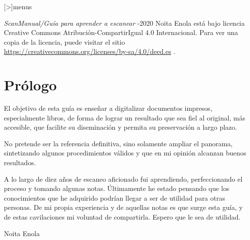 \documentclass[%
	a5paper,
	10pt,
	twoside,
	openright,
	final,
]{memoir}
\begin{document}
%
	\renewmenumacro{\menu}[>]{menus}

	\newpage\null\thispagestyle{empty}\newpage
	\newpage\null\thispagestyle{empty}\newpage

\frontmatter
	\thispagestyle{empty}%
	\halftitleTH%
	\cleardoublepage%
	\thispagestyle{empty}%
	\titleTH%
	\clearpage%

	\thispagestyle{empty}%
	{\emph{ScanManual/Guía para aprender a escanear} -2020 Noita Enola está bajo licencia Creative Commons Atribución-CompartirIgual 4.0 Internacional. Para ver una copia de la licencia, puede visitar el sitio \url{https://creativecommons.org/licenses/by-sa/4.0/deed.es} \cite{CC-BY-SA-4.0}.

	\vfill
	\license

	\chapter{Prólogo} El objetivo de esta guía es enseñar a digitalizar documentos impresos, especialmente libros, de forma de lograr un resultado que sea fiel al original, más accesible, que facilite su diseminación y permita su preservación a largo plazo.

	No pretende ser la referencia definitiva, sino solamente ampliar el panorama, sintetizando algunos procedimientos válidos y que en mi opinión alcanzan buenos resultados.

	A lo largo de diez años de escaneo aficionado fui aprendiendo, perfeccionando el proceso y tomando algunas notas. Últimamente he estado pensando que los conocimientos que he adquirido podrían llegar a ser de utilidad para otras personas. De mi propia experiencia y de aquellas notas es que surge esta guía, y de estas cavilaciones mi voluntad de compartirla. Espero que le sea de utilidad.

	{\raggedleft Noita Enola\par}\cleardoublepage

	\tableofcontents

\mainmatter

}
\end{document}
